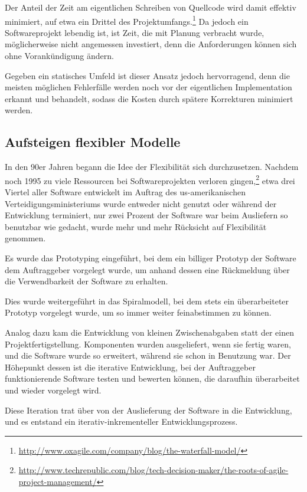 		Der Anteil der Zeit am eigentlichen Schreiben von Quellcode wird damit effektiv minimiert, auf etwa ein Drittel des Projektumfangs.\footnote{
			\url{http://www.oxagile.com/company/blog/the-waterfall-model/}
		}
		Da jedoch ein Softwareprojekt lebendig ist, ist Zeit, die mit Planung verbracht wurde, möglicherweise nicht angemessen investiert, denn die Anforderungen können sich ohne Vorankündigung ändern.
		
		Gegeben ein statisches Umfeld ist dieser Ansatz jedoch hervorragend, denn die meisten möglichen Fehlerfälle werden noch vor der eigentlichen Implementation erkannt und behandelt, sodass die Kosten durch spätere Korrekturen minimiert werden.
		
	\subsection{Aufsteigen flexibler Modelle}
		\label{ssec:flexible}
		In den 90er Jahren begann die Idee der Flexibilität sich durchzusetzen.
		Nachdem noch 1995 zu viele Ressourcen bei Softwareprojekten verloren gingen,\footnote{
			\url{http://www.techrepublic.com/blog/tech-decision-maker/the-roots-of-agile-project-management/}
		} etwa drei Viertel aller Software entwickelt im Auftrag des us-amerikanischen Verteidigungsministeriums wurde entweder nicht genutzt oder während der Entwicklung terminiert, nur zwei Prozent der Software war beim Ausliefern so benutzbar wie gedacht, wurde mehr und mehr Rücksicht auf Flexibilität genommen.
		
		Es wurde das Prototyping eingeführt, bei dem ein billiger Prototyp der Software dem Auftraggeber vorgelegt wurde, um anhand dessen eine Rückmeldung über die Verwendbarkeit der Software zu erhalten.
		
		Dies wurde weitergeführt in das Spiralmodell, bei dem stets ein überarbeiteter Prototyp vorgelegt wurde, um so immer weiter feinabstimmen zu können.
		
		Analog dazu kam die Entwicklung von kleinen Zwischenabgaben statt der einen Projektfertigstellung.
		Komponenten wurden ausgeliefert, wenn sie fertig waren, und die Software wurde so erweitert, während sie schon in Benutzung war.
		Der Höhepunkt dessen ist die iterative Entwicklung, bei der Auftraggeber funktionierende Software testen und bewerten können, die daraufhin überarbeitet und wieder vorgelegt wird.
		
		Diese Iteration trat über von der Auslieferung der Software in die Entwicklung, und es entstand ein iterativ-inkrementeller Entwicklungsprozess.
		
